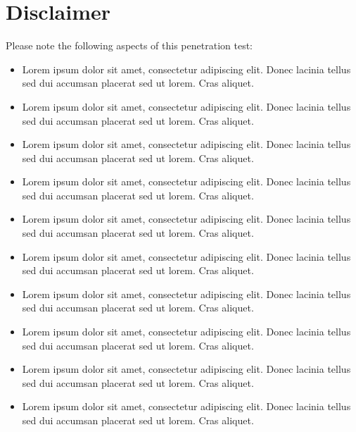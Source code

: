 %
%
%
\clearpage

\chapter{Disclaimer}
\label{chapter:Disclaimer}

\small
\noindent Please note the following aspects of this penetration test:

\begin{itemize}
    \item	 Lorem ipsum dolor sit amet, consectetur adipiscing elit. Donec lacinia tellus sed dui accumsan placerat sed ut lorem. Cras aliquet. 
    
    \item	 Lorem ipsum dolor sit amet, consectetur adipiscing elit. Donec lacinia tellus sed dui accumsan placerat sed ut lorem. Cras aliquet. 
    
    \item	 Lorem ipsum dolor sit amet, consectetur adipiscing elit. Donec lacinia tellus sed dui accumsan placerat sed ut lorem. Cras aliquet. 
    
    \item	 Lorem ipsum dolor sit amet, consectetur adipiscing elit. Donec lacinia tellus sed dui accumsan placerat sed ut lorem. Cras aliquet. 
    
    \item	 	Lorem ipsum dolor sit amet, consectetur adipiscing elit. Donec lacinia tellus sed dui accumsan placerat sed ut lorem. Cras aliquet. 
    
    \item	 	Lorem ipsum dolor sit amet, consectetur adipiscing elit. Donec lacinia tellus sed dui accumsan placerat sed ut lorem. Cras aliquet. 
    
    \item	 	Lorem ipsum dolor sit amet, consectetur adipiscing elit. Donec lacinia tellus sed dui accumsan placerat sed ut lorem. Cras aliquet. 
    
    \item	 	Lorem ipsum dolor sit amet, consectetur adipiscing elit. Donec lacinia tellus sed dui accumsan placerat sed ut lorem. Cras aliquet. 
    
    \item	 	Lorem ipsum dolor sit amet, consectetur adipiscing elit. Donec lacinia tellus sed dui accumsan placerat sed ut lorem. Cras aliquet. 
    
    \item	 	Lorem ipsum dolor sit amet, consectetur adipiscing elit. Donec lacinia tellus sed dui accumsan placerat sed ut lorem. Cras aliquet. 
    
    \end{itemize}